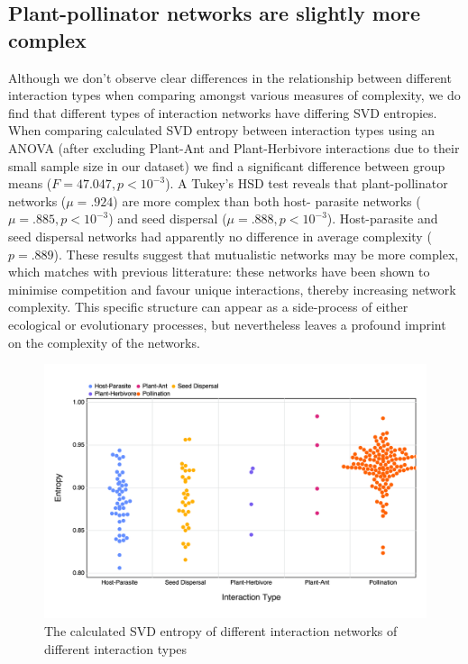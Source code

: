\subsection{Plant-pollinator networks are slightly more
complex}\label{plant-pollinator-networks-are-slightly-more-complex}

Although we don't observe clear differences in the relationship between
different interaction types when comparing amongst various measures of
complexity, we do find that different types of interaction networks have
differing SVD entropies. When comparing calculated SVD entropy between
interaction types using an ANOVA (after excluding Plant-Ant and Plant-Herbivore
interactions due to their small sample size in our dataset) we find a
significant difference between group means (\(F = 47.047, p < 10^{-3}\)). A
Tukey's HSD test reveals that plant-pollinator networks (\(\mu = .924\)) are
more complex than both host- parasite networks (\(\mu = .885, p < 10^{-3}\)) and
seed dispersal (\(\mu = .888, p < 10^{-3}\)). Host-parasite and seed dispersal
networks had apparently no difference in average complexity (\(p = .889\)).
These results suggest that mutualistic networks may be more complex, which
matches with previous litterature: these networks have been shown to minimise
competition \cite{Bastolla2009ArcMut} and favour unique interactions, thereby
increasing network complexity. This specific structure can appear as a
side-process of either ecological \cite{Maynard2018NetSpa} or evolutionary
\cite{Valverde2018ArcMut} processes, but nevertheless leaves a profound imprint
on the complexity of the networks.

\begin{figure}[h]
    \centering
    \includegraphics[width=\textwidth]{figures/interactiontype_v_entropy.png}
    \caption{The calculated SVD entropy of different interaction networks of
different interaction types}
    \label{fig:type}
\end{figure}

